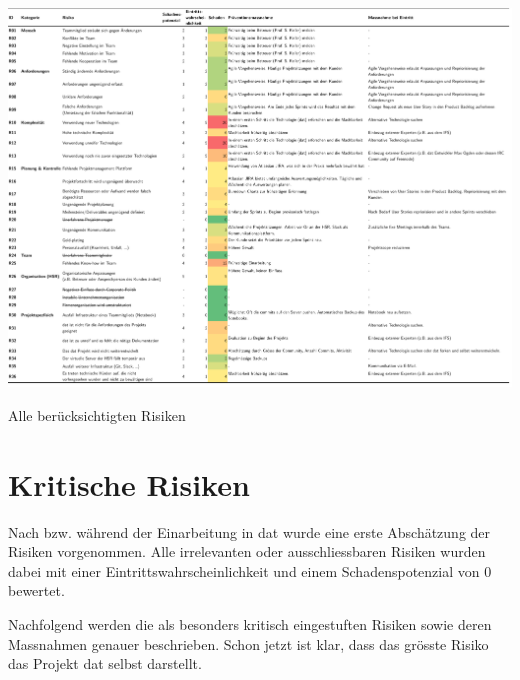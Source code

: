 \begin{landscape}
	\begin{table}[H]
		\centering
		\includegraphics[height=.9\textheight,keepaspectratio]{risikoanalyse.pdf}
		\caption{Alle berücksichtigten Risiken}
		\label{tab:risikoanalyse}
	\end{table}
\end{landscape}



\section{Kritische Risiken}
Nach bzw. während der Einarbeitung in \gls{dat} wurde eine erste Abschätzung der Risiken vorgenommen. Alle irrelevanten oder ausschliessbaren Risiken wurden dabei mit einer Eintrittswahrscheinlichkeit und einem Schadenspotenzial von 0 bewertet.

Nachfolgend werden die als besonders kritisch eingestuften Risiken sowie deren Massnahmen genauer beschrieben. Schon jetzt ist klar, dass das grösste Risiko das Projekt \gls{dat} selbst darstellt.

\newcommand{\projectrisk}[4]{
\begin{tabularx}{\linewidth}{lX}
	\toprule
	\textbf{Risiko} & #1\\
	\midrule
	\textbf{Titel} & #2\\
	\textbf{Beschreibung} & #3\\
	\textbf{Prävention/Massnahme} & #4\\
	\bottomrule
\end{tabularx}	
}

